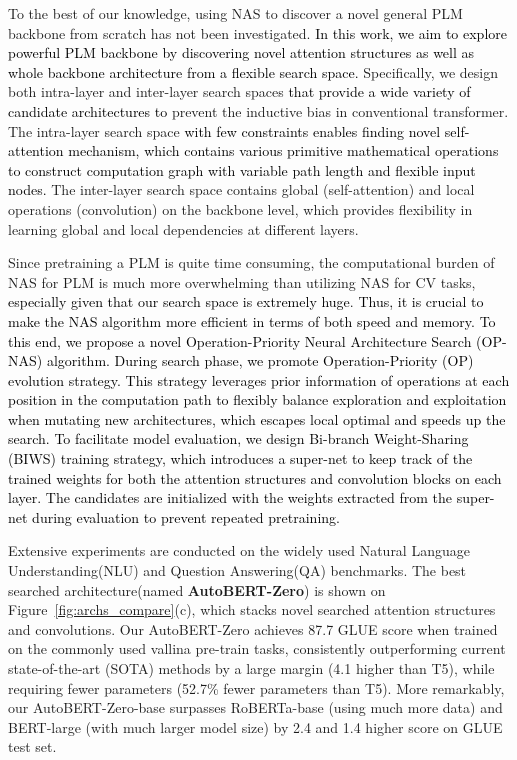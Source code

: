 \documentclass[letterpaper]{article} \usepackage{aaai22}  \usepackage{times}  \usepackage{helvet}  \usepackage{courier}  \usepackage[hyphens]{url}  \usepackage{graphicx} \urlstyle{rm} \def\UrlFont{\rm}  \usepackage{natbib}  \usepackage{caption} \DeclareCaptionStyle{ruled}{labelfont=normalfont,labelsep=colon,strut=off} \frenchspacing  \setlength{\pdfpagewidth}{8.5in}  \setlength{\pdfpageheight}{11in}  \usepackage{algorithm}
\newcommand{\prj}[1]{\textcolor{black}{#1}} \newcommand{\prjj}[1]{\textcolor{black}{#1}} \newcommand{\jhh}[1]{\textcolor{black}{#1}} \newcommand{\jh}[1]{\textcolor{black}{#1}} \newcommand{\sh}[1]{\textcolor{black}{#1}} \usepackage{multirow}
\begin{document}
To the best of our knowledge, using NAS to discover a novel general PLM backbone from scratch has not been investigated.
\prjj{In this work, we aim to explore powerful PLM backbone by discovering novel attention structures as well as whole backbone architecture from a flexible search space.} Specifically, we design both intra-layer and inter-layer search spaces \prjj{that provide a wide variety of candidate architectures to} prevent the inductive bias in conventional transformer. The intra-layer search space \prjj{with few constraints enables finding novel self-attention mechanism, which contains various primitive mathematical operations to construct computation graph with variable path length and flexible input nodes.} 
The inter-layer search space contains global (self-attention) and local operations (convolution) on the backbone level, which provides flexibility in learning global and local dependencies at different layers.

Since pretraining a PLM is quite time consuming, the computational burden of NAS for PLM is much more overwhelming than utilizing NAS for CV tasks, \prjj{especially given that our search space is extremely huge}.
\prj{Thus, it is crucial to make the NAS algorithm more efficient \prjj{in terms of both speed and memory}. 
\prjj{To this end, we propose a novel Operation-Priority Neural Architecture Search (OP-NAS) algorithm.
During search phase}, we promote Operation-Priority (OP) evolution strategy. This strategy \prjj{leverages prior information of operations at each position in the computation path to flexibly balance exploration and exploitation when mutating new architectures, which escapes local optimal and speeds up the search.}
To facilitate model evaluation, we design Bi-branch Weight-Sharing (BIWS) training strategy, which introduces a super-net to keep track of the trained weights for both the attention structures and convolution blocks \jh{on each layer}. The candidates are initialized with the weights extracted from the super-net during evaluation to prevent repeated pretraining.}


Extensive experiments are conducted on the widely used Natural Language Understanding(NLU) and Question Answering(QA) benchmarks.
The best searched architecture(named \textbf{AutoBERT-Zero}) is shown on Figure~\ref{fig:archs_compare}(c), which stacks novel searched attention structures and convolutions. Our AutoBERT-Zero achieves 87.7 GLUE score when trained on the commonly used vallina pre-train tasks, consistently outperforming current state-of-the-art (SOTA) methods by a large margin (4.1 higher than T5), while requiring fewer parameters (52.7\% fewer parameters than T5).
More remarkably, our AutoBERT-Zero-base surpasses RoBERTa-base (using much more data) and BERT-large (with much larger model size) by 2.4 and 1.4 higher score on GLUE test set.
\end{document}
